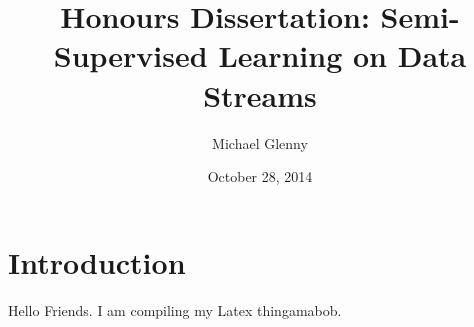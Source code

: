 \documentclass[10pt]{report}
\begin{document}
\title{Honours Dissertation: Semi-Supervised Learning on Data Streams}
\author{Michael Glenny}
\date{October 28, 2014}
\maketitle
\section{Introduction}
Hello Friends. I am compiling my Latex thingamabob.
\end{document}
